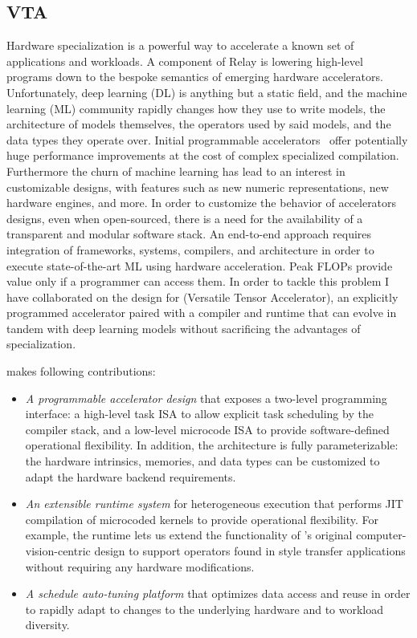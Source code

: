 \subsection{VTA}
\label{sec:vta}

Hardware specialization is a powerful way to accelerate
  a known set of applications and workloads.
A component of Relay is lowering high-level programs down
  to the bespoke semantics of emerging hardware accelerators.
Unfortunately, deep learning (DL) is anything but a static field, and the machine learning (ML) community
  rapidly changes how they use to write models, the architecture of models themselves, the operators
  used by said models, and the data types they operate over.
Initial programmable accelerators~\citep{tpuv1} offer potentially huge performance
  improvements at the cost of complex specialized compilation.
Furthermore the churn of machine learning has lead to an interest
  in customizable designs, with features such as new numeric representations,
  new hardware engines, and more.
In order to customize the behavior of accelerators designs, even when open-sourced,
  there is a need for the availability of a transparent and modular software stack.
An end-to-end approach requires integration of frameworks, systems, compilers,
  and architecture in order to execute state-of-the-art ML using hardware acceleration.
Peak FLOPs provide value only if a programmer can access them.
In order to tackle this problem I have collaborated on the design for \vta (Versatile Tensor Accelerator),
  an explicitly programmed accelerator paired with a compiler and runtime that can evolve
  in tandem with deep learning models without sacrificing the advantages of specialization.

\vta makes following contributions:

\begin{itemize}
    \item \emph{A programmable accelerator design} that exposes a two-level programming interface: a high-level task ISA to allow explicit task scheduling by the compiler stack, and a low-level microcode ISA to provide software-defined operational flexibility.
    In addition, the \vta architecture is fully parameterizable: the hardware intrinsics, memories, and data types can be customized to adapt the hardware backend requirements.
    \item \emph{An extensible runtime system} for heterogeneous execution that performs JIT compilation of microcoded kernels to provide operational flexibility. For example, the \vta runtime lets us extend the functionality of \vta's original computer-vision-centric design to support operators found in style transfer applications without requiring any hardware modifications.
    \item \emph{A schedule auto-tuning platform} that optimizes data access and reuse in order to rapidly adapt to changes to the underlying hardware and to workload diversity.
\end{itemize}

